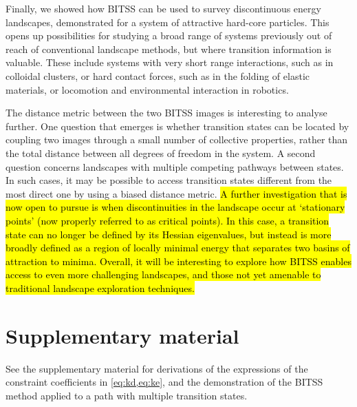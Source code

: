 \documentclass[aip,jcp,reprint,twocolumn]{revtex4-1}
\begin{document}
Finally, we showed how BITSS can be used to survey discontinuous energy landscapes, demonstrated for a system of attractive hard-core particles.
This opens up possibilities for studying a broad range of systems previously out of reach of conventional landscape methods, but where transition information is valuable.
These include systems with very short range interactions, such as in colloidal clusters, or hard contact forces, such as in the folding of elastic materials, or locomotion and environmental interaction in robotics.


The distance metric between the two BITSS images is interesting to analyse further.
One question that emerges is whether transition states can be located by coupling two images through a small number of collective properties, rather than the total distance between all degrees of freedom in the system.
A second question concerns landscapes with multiple competing pathways between states.
In such cases, it may be possible to access transition states different from the most direct one by using a biased distance metric.
\hl{A further investigation that is now open to pursue is when discontinuities in the landscape occur at `stationary points' (now properly referred to as critical points).
In this case, a transition state can no longer be defined by its Hessian eigenvalues, but instead is more broadly defined as a region of locally minimal energy that separates two basins of attraction to minima.
Overall, it will be interesting to explore how BITSS enables access to even more challenging landscapes, and those not yet amenable to traditional landscape exploration techniques.}


\section*{Supplementary material}
See the supplementary material for derivations of the expressions of the constraint coefficients in \cref{eq:kd,eq:ke}, and the demonstration of the BITSS method applied to a path with multiple transition states.
\end{document}
